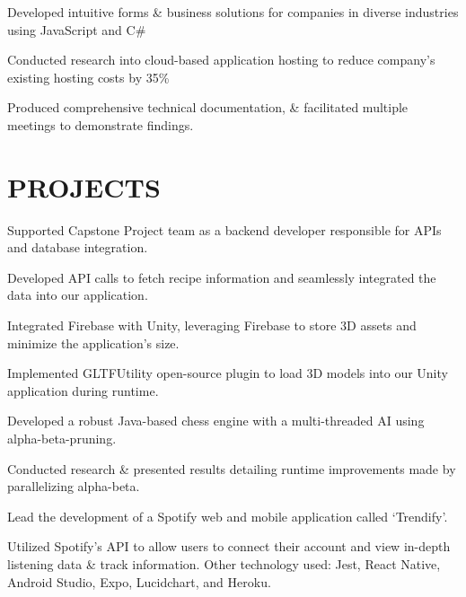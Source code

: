 \documentclass[]{deedy-resume-openfont}
\begin{document}
\begin{tightemize}
\item Developed intuitive forms \& business solutions for companies in diverse industries using JavaScript and C\#
\item Conducted research into cloud-based application hosting to reduce company's existing hosting costs by 35\% 
\item Produced comprehensive technical documentation, \& facilitated multiple meetings to demonstrate findings.
\end{tightemize}


\section{PROJECTS}
\begin{tightemize}
\item Supported Capstone Project team as a backend developer responsible for APIs and database integration.
\item Developed API calls to fetch recipe information and seamlessly integrated the data into our application. 
\item Integrated Firebase with Unity, leveraging Firebase to store 3D assets and minimize the application's size. 
\item Implemented  GLTFUtility open-source plugin to load 3D models into our Unity application during runtime.
\end{tightemize}
\sectionsep

\begin{tightemize}
\item Developed a robust Java-based chess engine with a multi-threaded AI using alpha-beta-pruning. 
\item Conducted research \& presented results detailing runtime improvements made by parallelizing alpha-beta.
\end{tightemize}
\sectionsep

\begin{tightemize}
\item Lead the development of a Spotify web and mobile application called ‘Trendify’. 
\item Utilized Spotify’s API to allow users to connect their account and view in-depth listening data \& track information. Other technology used: Jest, React Native, Android Studio, Expo, Lucidchart, and Heroku.
\end{tightemize}
\end{document}
